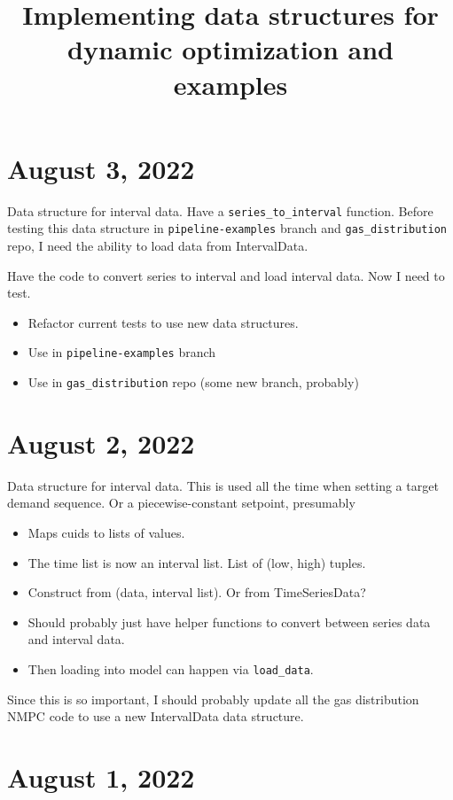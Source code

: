 \documentclass{article}
\title{Implementing data structures for dynamic optimization and examples}
\begin{document}
\maketitle

\section{August 3, 2022}

Data structure for interval data.
Have a \texttt{series\_to\_interval} function.
Before testing this data structure in \texttt{pipeline-examples} branch
and \texttt{gas\_distribution} repo, I need the ability to load data
from IntervalData.

\medskip

Have the code to convert series to interval and load interval data.
Now I need to test.
\begin{itemize}
  \item Refactor current tests to use new data structures.
  \item Use in \texttt{pipeline-examples} branch
  \item Use in \texttt{gas\_distribution} repo (some new branch, probably)
\end{itemize}

\section{August 2, 2022}

Data structure for interval data.
This is used all the time when setting a target demand sequence.
Or a piecewise-constant setpoint, presumably
\begin{itemize}
  \item Maps cuids to lists of values.
  \item The time list is now an interval list.
    List of (low, high) tuples.
  \item Construct from (data, interval list).
    Or from TimeSeriesData?
  \item Should probably just have helper functions to convert between
    series data and interval data.
  \item Then loading into model can happen via \texttt{load\_data}.
\end{itemize}
Since this is so important, I should probably update all the gas distribution
NMPC code to use a new IntervalData data structure.

\section{August 1, 2022}
\end{document}
